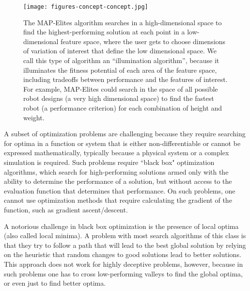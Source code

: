 \documentclass[twocolumn, DIV25, 9pt]{scrartcl}
\begin{document}
\begin{figure}
\centering
\texttt{[image: figures-concept-concept.jpg]}
\caption{The MAP-Elites algorithm searches in a high-dimensional space to find the highest-performing solution at each point in a low-dimensional feature space, where the user gets to choose dimensions of variation of interest that define the low dimensional space. We call this type of algorithm an ``illumination algorithm'', because it illuminates the fitness potential of each area of the feature space, including tradeoffs between performance and the features of interest. For example, MAP-Elites could search in the space of all possible robot designs (a very high dimensional space) to find the fastest robot (a performance criterion) for each combination of height and weight.}
\label{conceptFig}
\end{figure}

A subset of optimization problems are challenging because they require searching for optima in a function or system that is either non-differentiable or cannot be expressed mathematically, typically because a physical system or a complex simulation is required. Such problems require ``black box" optimization algorithms, which search for high-performing solutions armed only with the ability to determine the performance of a solution, but without access to the evaluation function that determines that performance. On such problems, one cannot use optimization methods that require calculating the gradient of the function, such as gradient ascent/descent. 
 
A notorious challenge in black box optimization is the presence of local optima (also called local minima)\cite{russell1995artificial,floreano2008bio}.
A problem with most search algorithms of this class is that they try to follow a path that will lead to the best global solution by relying on the heuristic that random changes to good solutions lead to better solutions. This approach does not work for highly deceptive problems, however, because in such problems one has to cross low-performing valleys to find the global optima, or even just to find better optima\cite{floreano2008bio}.
\end{document}
